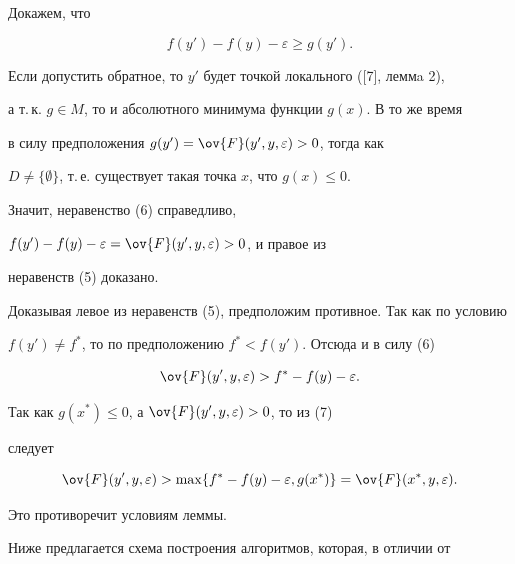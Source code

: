 \begin{pf}


Докажем, что


\begin{equation}


f(y')-f(y)-\varepsilon\ge g(y').


\end{equation}





Если допустить обратное, то $y'$ будет точкой локального ([7], леммa 2),


а т.\,к. $g\in M$, то и абсолютного минимума функции $g(x)$. В то же время


в силу предположения $g(y')=\ov{F}(y',y,\varepsilon)>0$, тогда как


$D\ne\{\emptyset\}$, т.\,е. существует такая точка $x$, что $g(x)\le 0$.


Значит, неравенство (6) справедливо,


$f(y')-f(y)-\varepsilon=\ov{F}(y',y,\varepsilon)>0$, и правое из


неравенств (5) доказано.





Доказывая левое из неравенств (5), предположим противное. Так как по условию


$f(y')\ne f^*$, то по предположению $f^*<f(y')$. Отсюда и в силу (6)


\begin{equation} 


\ov{F}(y',y,\varepsilon)>f^*-f(y)-\varepsilon.


\end{equation}





Так как $g(x^*)\le 0$, а $\ov{F}(y',y,\varepsilon)>0$, то из (7)


следует


$$


\ov{F}(y',y,\varepsilon)>\max\{f^*-f(y)-\varepsilon,g(x^*)\}


=\ov{F}(x^*,y,\varepsilon).


$$


Это противоречит условиям леммы.


\end{pf}





Ниже предлагается схема построения алгоритмов, которая, в отличии от


